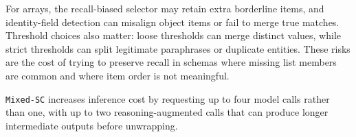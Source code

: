 For arrays, the recall-biased selector may retain extra borderline items, and identity-field detection can misalign object items or fail to merge true matches. Threshold choices also matter: loose thresholds can merge distinct values, while strict thresholds can split legitimate paraphrases or duplicate entities. These risks are the cost of trying to preserve recall in schemas where missing list members are common and where item order is not meaningful.

\texttt{Mixed-SC} increases inference cost by requesting up to four model calls rather than one, with up to two reasoning-augmented calls that can produce longer intermediate outputs before unwrapping.
